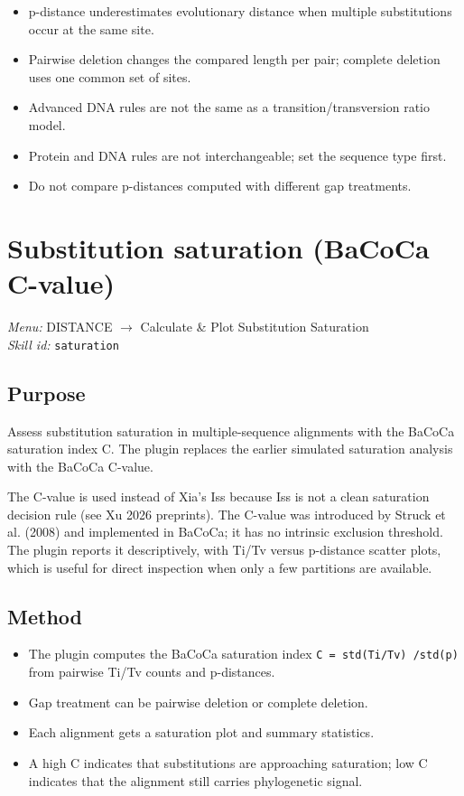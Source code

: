 \documentclass[11pt]{report}
\begin{document}
\begin{itemize}
  \item p-distance underestimates evolutionary distance when multiple substitutions occur at the same site.
  \item Pairwise deletion changes the compared length per pair; complete deletion uses one common set of sites.
  \item Advanced DNA rules are not the same as a transition/transversion ratio model.
  \item Protein and DNA rules are not interchangeable; set the sequence type first.
  \item Do not compare p-distances computed with different gap treatments.
\end{itemize}


\section{Substitution saturation (BaCoCa C-value)}
\noindent\textit{Menu:} DISTANCE $\rightarrow$ Calculate \& Plot Substitution Saturation\\
\noindent\textit{Skill id:} \texttt{saturation}

\subsection{Purpose}

Assess substitution saturation in multiple-sequence alignments with the BaCoCa saturation index C. The plugin replaces the earlier simulated saturation analysis with the BaCoCa C-value.

The C-value is used instead of Xia's Iss because Iss is not a clean saturation decision rule (see Xu 2026 preprints). The C-value was introduced by Struck et al. (2008) and implemented in BaCoCa; it has no intrinsic exclusion threshold. The plugin reports it descriptively, with Ti/Tv versus p-distance scatter plots, which is useful for direct inspection when only a few partitions are available.

\subsection{Method}

\begin{itemize}
  \item The plugin computes the BaCoCa saturation index \texttt{C = std\allowbreak (Ti/\allowbreak Tv) /\allowbreak  std\allowbreak (p)} from pairwise Ti/Tv counts and p-distances.
  \item Gap treatment can be pairwise deletion or complete deletion.
  \item Each alignment gets a saturation plot and summary statistics.
  \item A high C indicates that substitutions are approaching saturation; low C indicates that the alignment still carries phylogenetic signal.
\end{itemize}
\end{document}

